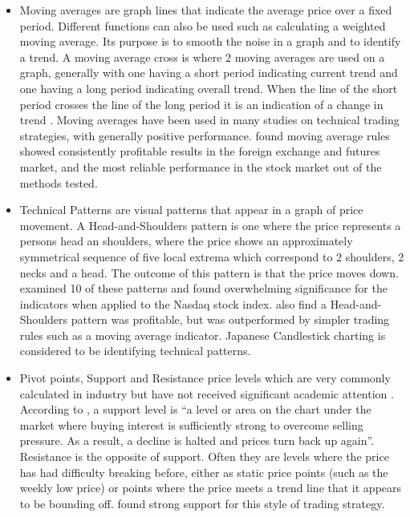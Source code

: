\documentclass{article}
\theoremstyle{definition}
\begin{document}
\begin{itemize}
\item Moving averages are graph lines that indicate the average price over a fixed period. Different functions can also be used such as calculating a weighted moving average. Its purpose is to smooth the noise in a graph and to identify a trend. A moving average cross is where 2 moving averages are used on a graph, generally with one having a short period indicating current trend and one having a long period indicating overall trend. When the line of the short period crosses the line of the long period it is an indication of a change in trend \citep{brock1992}. Moving averages have been used in many studies on technical trading strategies, with generally positive performance. \cite{taprofitability} found moving average rules showed consistently profitable results in the foreign exchange and futures market, and the most reliable performance in the stock market out of the methods tested.

\item Technical Patterns are visual patterns that appear in a graph of price movement. A Head-and-Shoulders pattern is one where the price represents a persons head an shoulders, where the price shows an approximately symmetrical sequence of five local extrema which correspond to 2 shoulders, 2 necks and a head. The outcome of this pattern is that the price moves down. \cite{foundations} examined 10 of these patterns and found overwhelming significance for the indicators when applied to the Nasdaq stock index. \cite{chang1999methodical} also find a Head-and-Shoulders pattern was profitable, but was outperformed by simpler trading rules such as a moving average indicator. Japanese Candlestick charting is considered to be identifying technical patterns.

\item Pivot points, Support and Resistance price levels which are very commonly calculated in industry but have not received significant academic attention \citep[p. 55]{osler2000support}. According to \cite{murphy1999technical}, a support level is ``a level or area on the chart under the market where buying interest is sufficiently strong to overcome selling pressure. As a result, a decline is halted and prices turn back up again''. Resistance is the opposite of support. Often they are levels where the price has had difficulty breaking before, either as static price points (such as the weekly low price) or points where the price meets a trend line that it appears to be bounding off. \cite{brock1992} found strong support for this style of trading strategy.

\end{itemize}
\end{document}

